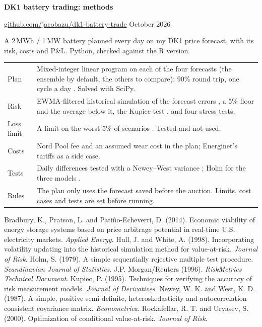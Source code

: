 \documentclass[11pt,a4paper]{article}
\begin{document}
{\sffamily\bfseries\Large DK1 battery trading: methods}\par
\href{https://github.com/jacobazu/dk1-battery-trade}{github.com/jacobazu/dk1-battery-trade} \textperiodcentered{} October 2026

A 2\,MWh / 1\,MW battery planned every day on my DK1 price forecast, with its risk, costs and P\&L. Python, checked against the R version.

\begin{center}\small
\begin{tabularx}{\linewidth}{@{}lL@{}}
\toprule
Plan & Mixed-integer linear program on each of the four forecasts (the ensemble by default, the others to compare): 90\% round trip, one cycle a day \citep{bradbury2014}. Solved with SciPy. \\
Risk & EWMA-filtered historical simulation of the forecast errors \citep{hull1998,riskmetrics1996}, a 5\% floor and the average below it, the Kupiec test \citep{kupiec1995}, and four stress tests. \\
Loss limit & A limit on the worst 5\% of scenarios \citep{rockafellar2000}. Tested and not used. \\
Costs & Nord Pool fee and an assumed wear cost in the plan; Energinet's tariffs as a side case. \\
Tests & Daily differences tested with a Newey--West variance \citep{newey1987}; Holm for the three models \citep{holm1979}. \\
Rules & The plan only uses the forecast saved before the auction. Limits, cost cases and tests are set before running. \\
\bottomrule
\end{tabularx}
\end{center}

\begin{thebibliography}{99}\small
{} Bradbury, K., Pratson, L. and Pati\~no-Echeverri, D. (2014). Economic viability of energy storage systems based on price arbitrage potential in real-time U.S. electricity markets. \textit{Applied Energy}.
 Hull, J. and White, A. (1998). Incorporating volatility updating into the historical simulation method for value-at-risk. \textit{Journal of Risk}.
 Holm, S. (1979). A simple sequentially rejective multiple test procedure. \textit{Scandinavian Journal of Statistics}.
 J.P. Morgan/Reuters (1996). \textit{RiskMetrics Technical Document}.
 Kupiec, P. (1995). Techniques for verifying the accuracy of risk measurement models. \textit{Journal of Derivatives}.
 Newey, W. K. and West, K. D. (1987). A simple, positive semi-definite, heteroskedasticity and autocorrelation consistent covariance matrix. \textit{Econometrica}.
 Rockafellar, R. T. and Uryasev, S. (2000). Optimization of conditional value-at-risk. \textit{Journal of Risk}.
\end{thebibliography}
\end{document}
